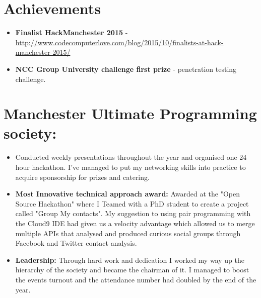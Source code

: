 \documentclass[12pt,a4paper]{res}
\begin{document}
\begin{resume}
\section{\large\bf Achievements}
  \begin{itemize}
  \item {\bf Finalist HackManchester 2015} - \url{http://www.codecomputerlove.com/blog/2015/10/finalists-at-hack-manchester-2015/}
  \item {\bf NCC Group University challenge first prize} - penetration testing challenge.
  \end{itemize}

\section{\bf Manchester Ultimate Programming society:}
\vspace{5mm}    
    \begin{itemize}
    \item[] Conducted weekly presentations throughout the year and organised one 24 hour hackathon. I've managed to put my networking skills into practice to acquire sponsorship for prizes and catering.
    \item{\bf Most Innovative technical approach award:} Awarded at the "Open Source Hackathon" where I Teamed with a PhD student to create a project called "Group My contacts". My suggestion to using pair programming with the Cloud9 IDE had given us a velocity advantage which allowed us to merge multiple APIs that analysed and produced curious social groups through Facebook and Twitter contact analysis.

      \item {\bf Leadership:} Through hard work and dedication I worked my way up the hierarchy of the society and became the chairman of it. I managed to boost the events turnout and the attendance number had doubled by the end of the year.
     \end{itemize}


\end{resume}
\end{document}
